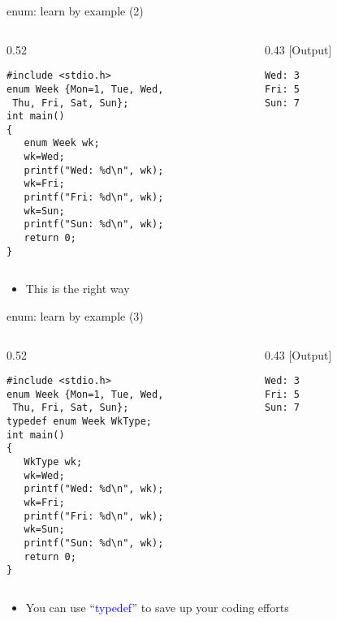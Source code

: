 \begin{frame}[fragile]{enum: learn by example (2)}
\begin{columns}
\begin{column}{0.52\linewidth}
\begin{lstlisting}
#include <stdio.h>
enum Week {Mon=1, Tue, Wed,
 Thu, Fri, Sat, Sun};
int main()
{
   enum Week wk;
   wk=Wed;
   printf("Wed: %d\n", wk);
   wk=Fri;
   printf("Fri: %d\n", wk);
   wk=Sun;
   printf("Sun: %d\n", wk);
   return 0;
}
\end{lstlisting}
\end{column}
\begin{column}{0.43\linewidth}
[Output]
\begin{lstlisting}
Wed: 3
Fri: 5
Sun: 7
\end{lstlisting}
\end{column}
\end{columns}
\begin{itemize}
	\item {This is the right way}
\end{itemize}
\end{frame}

\begin{frame}[fragile]{enum: learn by example (3)}
\begin{columns}
\begin{column}{0.52\linewidth}
\begin{lstlisting}
#include <stdio.h>
enum Week {Mon=1, Tue, Wed,
 Thu, Fri, Sat, Sun};
typedef enum Week WkType;
int main()
{
   WkType wk;
   wk=Wed;
   printf("Wed: %d\n", wk);
   wk=Fri;
   printf("Fri: %d\n", wk);
   wk=Sun;
   printf("Sun: %d\n", wk);
   return 0;
}
\end{lstlisting}
\end{column}
\begin{column}{0.43\linewidth}
[Output]
\begin{lstlisting}
Wed: 3
Fri: 5
Sun: 7
\end{lstlisting}
\end{column}
\end{columns}
\begin{itemize}
	\item {You can use ``\textcolor{blue}{typedef}'' to save up your coding efforts}
\end{itemize}
\end{frame}
